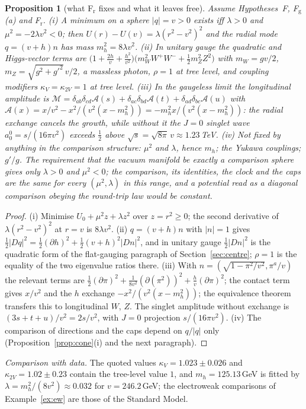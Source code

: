 \documentclass[aps,pra,onecolumn,superscriptaddress,nofootinbib,10pt]{revtex4-2}
\newtheorem{proposition}[theorem]{Proposition}
\theoremstyle{definition}
\theoremstyle{remark}
\begin{document}
\begin{proposition}[what F$_{\mathrm r}$ fixes and what it leaves free]\label{prop:radial}
Assume Hypotheses~F, F$_{\mathrm g}$(a) and F$_{\mathrm r}$.
(i) A minimum on a sphere $\lvert q\rvert=v>0$ exists iff $\lambda>0$ and $\mu^2=-2\lambda v^2<0$; then
$U(r)-U(v)=\lambda(r^2-v^2)^2$ and the radial mode $q=(v+h)n$ has mass $m_h^2=8\lambda v^2$.
(ii) In unitary gauge the quadratic and Higgs-vector terms are
$\bigl(1+\tfrac{2h}v+\tfrac{h^2}{v^2}\bigr)\bigl(m_W^2W^+W^-+\tfrac12m_Z^2Z^2\bigr)$ with $m_W=gv/2$, $m_Z=\sqrt{g^2+g'^2}\,v/2$, a massless
photon, $\rho=1$ at tree level, and coupling modifiers $\kappa_V=\kappa_{2V}=1$ at tree level.
(iii) In the gaugeless limit the longitudinal amplitude is $\mathcal M=\delta_{ab}\delta_{cd}\mathcal A(s)+\delta_{ac}\delta_{bd}\mathcal A(t)+\delta_{ad}\delta_{bc}\mathcal A(u)$ with
$\mathcal A(x)=x/v^2-x^2/(v^2(x-m_h^2))=-m_h^2x/(v^2(x-m_h^2))$: the radial exchange cancels the growth, while without
it the $J=0$ singlet wave $a_0^0=s/(16\pi v^2)$ exceeds $\tfrac12$ above $\sqrt s=\sqrt{8\pi}\,v\approx1.23$\,TeV.
(iv) Not fixed by anything in the comparison structure: $\mu^2$ and $\lambda$, hence $m_h$; the Yukawa couplings;
$g'/g$.  The requirement that the vacuum manifold be exactly a comparison sphere gives only $\lambda>0$ and
$\mu^2<0$; the comparison, its identities, the clock and the caps are the same for every $(\mu^2,\lambda)$ in this
range, and a potential read as a diagonal comparison obeying the round-trip law would be constant.
\end{proposition}
\begin{proof}
(i) Minimise $U_0+\mu^2z+\lambda z^2$ over $z=r^2\ge0$; the second derivative of $\lambda(r^2-v^2)^2$ at $r=v$ is $8\lambda v^2$.
(ii) $q=(v+h)n$ with $\lvert n\rvert=1$ gives $\tfrac12\lvert Dq\rvert^2=\tfrac12(\partial h)^2+\tfrac12(v+h)^2\lvert Dn\rvert^2$, and in unitary gauge $\tfrac12\lvert Dn\rvert^2$
is the quadratic form of the flat-gauging paragraph of Section~\ref{sec:centre}; $\rho=1$ is the equality of the
two eigenvalue ratios there.  (iii) With $n=(\sqrt{1-\pi^2/v^2},\pi^a/v)$ the relevant terms are
$\tfrac12(\partial\pi)^2+\tfrac1{8v^2}(\partial(\pi^2))^2+\tfrac hv(\partial\pi)^2$; the contact term gives $x/v^2$ and the $h$ exchange
$-x^2/(v^2(x-m_h^2))$; the equivalence theorem \cite{CLT74,LQT77} transfers this to longitudinal $W$, $Z$.  The
singlet amplitude without exchange is $(3s+t+u)/v^2=2s/v^2$, with $J=0$ projection $s/(16\pi v^2)$.
(iv) The comparison of directions and the caps depend on $q/\lvert q\rvert$ only (Proposition~\ref{prop:cone}(i) and the
next paragraph).
\end{proof}
\noindent\emph{Comparison with data.}  The quoted values $\kappa_V=1.023\pm0.026$ and $\kappa_{2V}=1.02\pm0.23$
\cite{ex-PDG26} contain the tree-level value $1$, and $m_h=125.13$\,GeV is fitted by
$\lambda=m_h^2/(8v^2)\approx0.032$ for $v=246.2$\,GeV; the electroweak comparisons of Example~\ref{ex:ew} are those of the
Standard Model.
\end{document}
